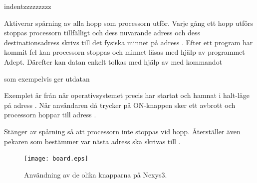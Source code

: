 \documentclass[main.tex]{subfiles}
\begin{document}
\begin{labeling}{indentzzzzzzzzz}
\item[\mono{trace\_enable}]
    Aktiverar spårning av alla hopp som processorn utför. Varje gång ett hopp
    utförs stoppas processorn tillfälligt och dess nuvarande adress och dess
    destinationsadress skrivs till det fysiska minnet på adress .
    Efter ett program har kommit fel kan processorn stoppas och minnet läsas
    med hjälp av programmet Adept. Därefter kan datan enkelt tolkas med
    hjälp av  med kommandot
    
    som exempelvis ger utdatan
    
    Exemplet är från när operativsystemet precis har startat och hamnat i
    halt-läge på adress . När användaren då trycker på ON-knappen
    sker ett avbrott och processorn hoppar till adress .
\item[\mono{trace\_disable}]
    Stänger av spårning så att processorn inte stoppas vid hopp. Återställer
    även pekaren som bestämmer var nästa adress ska skrivas till
    .
\end{labeling}

\begin{figure}
    \center
    \texttt{[image: board.eps]}
    \caption{Användning av de olika knapparna på Nexys3.}
    \label{fig:interface}
\end{figure}

\clearpage
\end{document}
